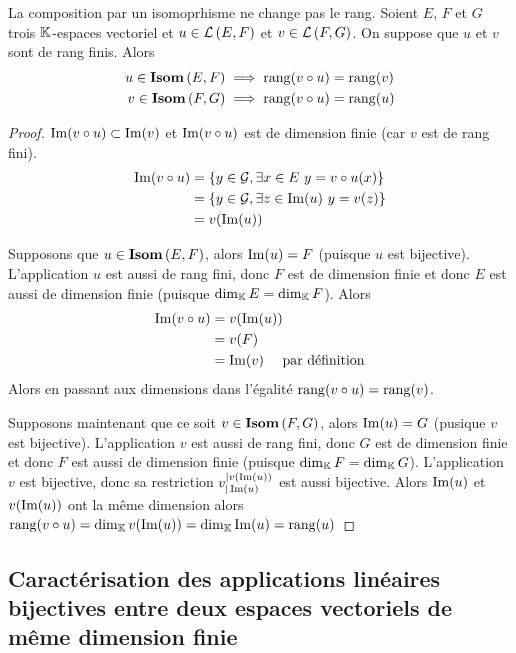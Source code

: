 \begin{theo}
  La composition par un isomoprhisme ne change pas le rang. Soient \(E\), \(F\) et \(G\) trois \(\mathbb{K}\)-espaces vectoriel et \(u \in \mathcal{L}\left(E,F\right)\) et \(v\in \mathcal{L}\left(F,G\right)\). On suppose que \(u\) et \(v\) sont de rang finis. Alors
  \begin{align}
    u \in \mathbf{Isom}\left(E,F\right) &\implies \operatorname{rang}(v \circ u)=\operatorname{rang}(v) \\
    v \in \mathbf{Isom}\left(F,G\right) &\implies \operatorname{rang}(v \circ u)=\operatorname{rang}(u)
  \end{align}
\end{theo}
\begin{proof}
  \(\operatorname{Im}(v \circ u) \subset \operatorname{Im}(v)\) et \(\operatorname{Im}(v \circ u)\) est de dimension finie (car \(v\) est de rang fini).
  \begin{align}
    \operatorname{Im}(v \circ u) &= \{y \in \mathcal{G}, \exists x \in E \ y=v \circ u(x) \}\\
    &=\{y \in \mathcal{G}, \exists z \in \operatorname{Im}(u) \ y=v(z)\}\\
    &=v(\operatorname{Im}(u))
  \end{align}

  Supposons que \(u \in \mathbf{Isom}\left(E,F\right)\), alors \(\operatorname{Im}(u) = F\) (puisque \(u\) est bijective). L'application \(u\) est aussi de rang fini, donc \(F\) est de dimension finie et donc \(E\) est aussi de dimension finie (puisque \(\operatorname{dim}_{\mathbb{K}} E = \operatorname{dim}_{\mathbb{K}} F\)). Alors
  \begin{align}
    \operatorname{Im}(v \circ u) &= v(\operatorname{Im}(u)) \\
    &=v(F) \\
    &=\operatorname{Im}(v) \quad \text{~par définition}
  \end{align}
  Alors en passant aux dimensions dans l'égalité \(\operatorname{rang}(v \circ u) = \operatorname{rang}(v)\).

  Supposons maintenant que ce soit \(v \in \mathbf{Isom}\left(F,G\right)\), alors \(\operatorname{Im}(u) = G\) (pusique \(v\) est bijective).  L'application \(v\) est aussi de rang fini, donc \(G\) est de dimension finie et donc \(F\) est aussi de dimension finie (puisque \(\operatorname{dim}_{\mathbb{K}} F = \operatorname{dim}_{\mathbb{K}} G\)). L'application \(v\) est bijective, donc sa restriction \(v_{|\operatorname{Im}(u)}^{|v(\operatorname{Im}(u))}\) est aussi bijective. Alors \(\operatorname{Im}(u)\) et \(v(\operatorname{Im}(u))\) ont la même dimension alors \(\operatorname{rang}(v \circ u) =\operatorname{dim}_{\mathbb{K}} v(\operatorname{Im}(u))= \operatorname{dim}_{\mathbb{K}} \operatorname{Im}(u) = \operatorname{rang}(u)\)
\end{proof}

\subsection[Caractérisation des applications linéaires bijectives]{Caractérisation des applications linéaires bijectives entre deux espaces vectoriels de même dimension finie}

